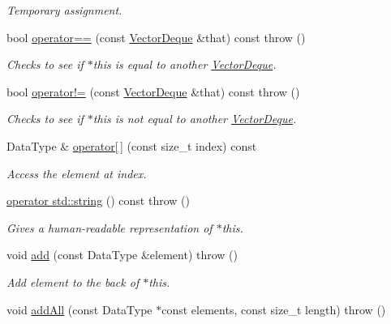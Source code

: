 \begin{DoxyCompactItemize}
\begin{DoxyCompactList}\small\item\em Temporary assignment. \end{DoxyCompactList}\item 
bool \hyperlink{classVectorDeque_a0595132279942b754d035d1e2fedbacb}{operator==} (const \hyperlink{classVectorDeque}{Vector\-Deque} \&that) const   throw ()
\begin{DoxyCompactList}\small\item\em Checks to see if {\ttfamily $\ast$this} is equal to another {\ttfamily \hyperlink{classVectorDeque}{Vector\-Deque}}. \end{DoxyCompactList}\item 
bool \hyperlink{classVectorDeque_ab14f8f936e72e47a71b6345b6e2ee5b1}{operator!=} (const \hyperlink{classVectorDeque}{Vector\-Deque} \&that) const   throw ()
\begin{DoxyCompactList}\small\item\em Checks to see if {\ttfamily $\ast$this} is not equal to another \hyperlink{classVectorDeque}{Vector\-Deque}. \end{DoxyCompactList}\item 
Data\-Type \& \hyperlink{classVectorDeque_a1c554dd6085326d0054c32736059654a}{operator\mbox{[}$\,$\mbox{]}} (const size\-\_\-t index) const 
\begin{DoxyCompactList}\small\item\em Access the element at {\ttfamily index}. \end{DoxyCompactList}\item 
\hyperlink{classVectorDeque_a77f1a6f951f10d2dbb0a2d4ab37d3df1}{operator std\-::string} () const   throw ()
\begin{DoxyCompactList}\small\item\em Gives a human-\/readable representation of {\ttfamily $\ast$this}. \end{DoxyCompactList}\item 
void \hyperlink{classVectorDeque_a6627a3c5f96e0a597ca4b497789e2dbb}{add} (const Data\-Type \&element)  throw ()
\begin{DoxyCompactList}\small\item\em Add {\ttfamily element} to the back of {\ttfamily $\ast$this}. \end{DoxyCompactList}\item 
void \hyperlink{classVectorDeque_ac600744ac03b32391ce2b3326811944f}{add\-All} (const Data\-Type $\ast$const elements, const size\-\_\-t length)  throw ()

\end{DoxyCompactItemize}
